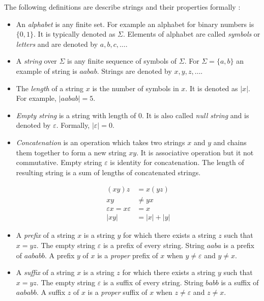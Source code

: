 \documentclass[12pt,final,oneside]{fithesis2}
\theoremstyle{definition}
\begin{document}
The following definitions are describe strings and their properties
formally \cite{Kozen97-1}:

\begin{itemize}

\item An \textit{alphabet} is any finite set. For example an alphabet for
binary numbers is $\{0, 1\}$. It is typically denoted as $\Sigma$. Elements
of alphabet are called \textit{symbols} or \textit{letters} and are denoted
by $a, b, c, \dots$.

\item A \textit{string} over $\Sigma$ is any finite sequence of symbols of
$\Sigma$. For $\Sigma = \{a, b\}$ an example of string is $aabab$. Strings
are denoted by $x, y, z, \dots$.

\item The \textit{length} of a string $x$ is the number of symbols in $x$.
It is denoted as $|x|$. For example, $|aabab| = 5$.

\item \textit{Empty string} is a string with length of 0. It is also called
\textit{null string} and is denoted by $\varepsilon$. Formally,
$|\varepsilon| = 0$.

\item \textit{Concatenation} is an operation which takes two strings $x$
and $y$ and chains them together to form a new string $xy$. It is
associative operation but it not commutative. Empty string $\varepsilon$ is
identity for concatenation. The length of resulting string is a sum of
lengths of concatenated strings.

\begin{align*}
(xy)z &= x(yz) \\
xy &\neq yx \\
\varepsilon x = x \varepsilon &= x \\
|xy| &= |x| + |y|
\end{align*}

\item A \textit{prefix} of a string $x$ is a string $y$ for which there
exists a string $z$ such that $x = yz$. The empty string $\varepsilon$ is
a prefix of every string. String $aaba$ is a prefix of $aababb$. A prefix
$y$ of $x$ is a \textit{proper} prefix of $x$ when $y \neq \varepsilon$ and
$y \neq x$.

\item A \textit{suffix} of a string $x$ is a string $z$ for which there
exists a string $y$ such that $x = yz$. The empty string $\varepsilon$ is
a suffix of every string. String $babb$ is a suffix of $aababb$. A suffix
$z$ of $x$ is a \textit{proper} suffix of $x$ when $z \neq \varepsilon$ and
$z \neq x$.

\end{itemize}
\end{document}
